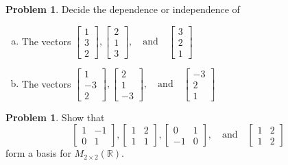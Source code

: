 \documentclass[10pt]{article}
\theoremstyle{definition}
\newtheorem{problem}[theorem]{Problem}
\newcommand{\1}[1]{\textbf{1}_{\left[#1\right]}} %
\def\R{\mathbb{R}} %
\begin{document}
\begin{problem}
  Decide the dependence or independence of
  \begin{enumerate}[(a)]
    \item The vectors $
    \begin{bmatrix}
      1\\3\\2
    \end{bmatrix},
    \begin{bmatrix}
      2\\1\\3
    \end{bmatrix},
    \quad \text{and} \quad 
    \begin{bmatrix}
      3\\2\\1
    \end{bmatrix}
    $
    \item The vectors $
    \begin{bmatrix}
      1\\-3\\2
    \end{bmatrix},
    \begin{bmatrix}
      2\\1\\-3
    \end{bmatrix},
    \quad \text{and} \quad 
    \begin{bmatrix}
      -3\\2\\1
    \end{bmatrix}
    $
  \end{enumerate}
\end{problem}


\begin{problem}
  Show that
  \begin{equation*}
    \begin{bmatrix}
      1&-1\\0&1
    \end{bmatrix},
    \begin{bmatrix}
      1&2\\1&1
    \end{bmatrix},
    \begin{bmatrix}
      0&1\\-1&0
    \end{bmatrix},
    \quad \text{and} \quad 
    \begin{bmatrix}
      1&2\\1&2
    \end{bmatrix}
  \end{equation*}
  form a basis for $M_{2\times 2}(\R)$.
\end{problem}
\end{document}
